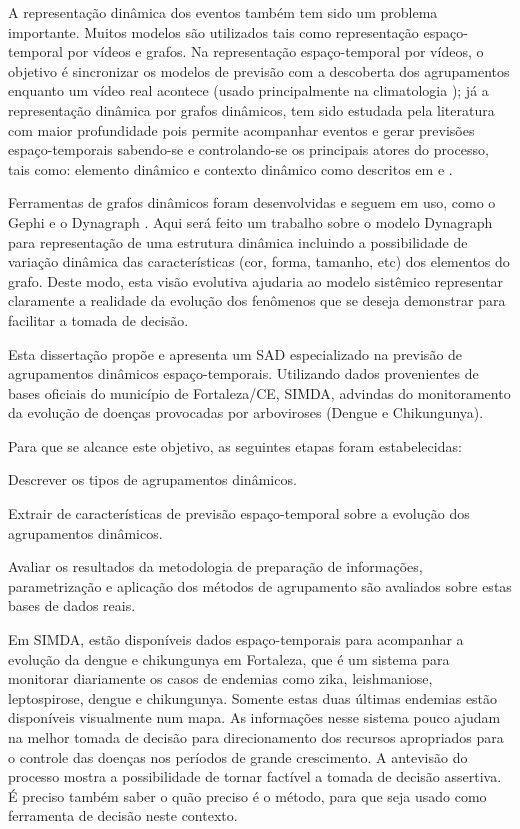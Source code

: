 A representação dinâmica dos eventos também tem sido um problema importante. Muitos modelos são utilizados tais como representação espaço-temporal por vídeos e grafos. Na representação espaço-temporal por vídeos, o objetivo é sincronizar os modelos de previsão com a descoberta dos agrupamentos enquanto um vídeo real acontece (usado principalmente na climatologia \cite{faghmous2013}); já a representação dinâmica por grafos dinâmicos, tem sido estudada pela literatura com maior profundidade pois permite acompanhar eventos e gerar previsões espaço-temporais sabendo-se e controlando-se os principais atores do processo, tais como: elemento dinâmico e contexto dinâmico como descritos em \cite{holme:predictability} e \cite{Mitsa:2010}.

Ferramentas de grafos dinâmicos foram desenvolvidas e seguem em uso, como o Gephi \cite{gephi} e o Dynagraph \cite{dynagraph}. Aqui será feito um trabalho sobre o modelo Dynagraph para representação de uma estrutura dinâmica incluindo a possibilidade de variação dinâmica das características (cor, forma, tamanho, etc) dos elementos do grafo. Deste modo, esta visão evolutiva ajudaria ao modelo sistêmico representar claramente a realidade da evolução dos fenômenos que se deseja demonstrar para facilitar a tomada de decisão.


Esta dissertação propõe e apresenta um \acrshort{SAD} especializado na previsão de agrupamentos dinâmicos espaço-temporais. Utilizando dados provenientes de bases oficiais do município de Fortaleza/CE, \acrfull{SIMDA}, advindas do monitoramento da evolução de doenças provocadas por arboviroses (Dengue e Chikungunya). 

Para que se alcance este objetivo, as seguintes etapas foram estabelecidas:

\begin{alineas}
    \item Descrever os tipos de agrupamentos dinâmicos.
	\item Extrair de características de previsão espaço-temporal sobre a evolução dos agrupamentos dinâmicos.
	\item Avaliar os resultados da metodologia de preparação de informações, parametrização e aplicação dos métodos de agrupamento são avaliados sobre estas bases de dados reais.
\end{alineas}


Em \acrshort{SIMDA}, estão disponíveis dados espaço-temporais para acompanhar a evolução da dengue e chikungunya em Fortaleza, que é um sistema para monitorar diariamente os casos de endemias como zika, leishmaniose, leptospirose, dengue e chikungunya. Somente estas duas últimas endemias estão disponíveis visualmente num mapa. As informações nesse sistema pouco ajudam na melhor tomada de decisão para direcionamento dos recursos apropriados para o controle das doenças nos períodos de grande crescimento. A antevisão do processo mostra a possibilidade de tornar factível a tomada de decisão assertiva. É preciso também saber o quão preciso é o método, para que seja usado como ferramenta de decisão neste contexto.

